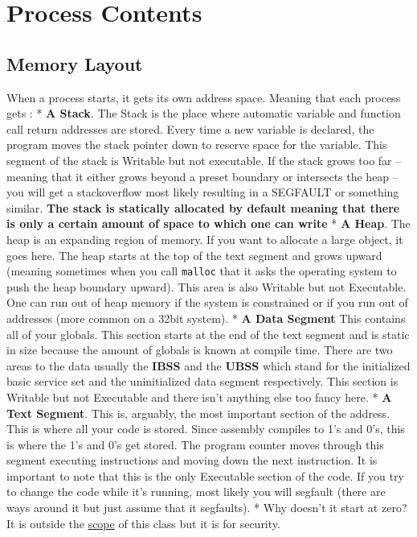 \section{Process Contents}\label{process-contents}

\subsection{Memory Layout}\label{memory-layout}

When a process starts, it gets its own address space. Meaning that each
process gets : * \textbf{A Stack}. The Stack is the place where
automatic variable and function call return addresses are stored. Every
time a new variable is declared, the program moves the stack pointer
down to reserve space for the variable. This segment of the stack is
Writable but not executable. If the stack grows too far -- meaning that
it either grows beyond a preset boundary or intersects the heap -- you
will get a stackoverflow most likely resulting in a SEGFAULT or
something similar. \textbf{The stack is statically allocated by default
meaning that there is only a certain amount of space to which one can
write} * \textbf{A Heap}. The heap is an expanding region of memory. If
you want to allocate a large object, it goes here. The heap starts at
the top of the text segment and grows upward (meaning sometimes when you
call \texttt{malloc} that it asks the operating system to push the heap
boundary upward). This area is also Writable but not Executable. One can
run out of heap memory if the system is constrained or if you run out of
addresses (more common on a 32bit system). * \textbf{A Data Segment}
This contains all of your globals. This section starts at the end of the
text segment and is static in size because the amount of globals is
known at compile time. There are two areas to the data usually the
\textbf{IBSS} and the \textbf{UBSS} which stand for the initialized
basic service set and the uninitialized data segment respectively. This
section is Writable but not Executable and there isn't anything else too
fancy here. * \textbf{A Text Segment}. This is, arguably, the most
important section of the address. This is where all your code is stored.
Since assembly compiles to 1's and 0's, this is where the 1's and 0's
get stored. The program counter moves through this segment executing
instructions and moving down the next instruction. It is important to
note that this is the only Executable section of the code. If you try to
change the code while it's running, most likely you will segfault (there
are ways around it but just assume that it segfaults). * Why doesn't it
start at zero? It is outside the
\href{https://en.wikipedia.org/wiki/Address_space_layout_randomization}{scope}
of this class but it is for security.


